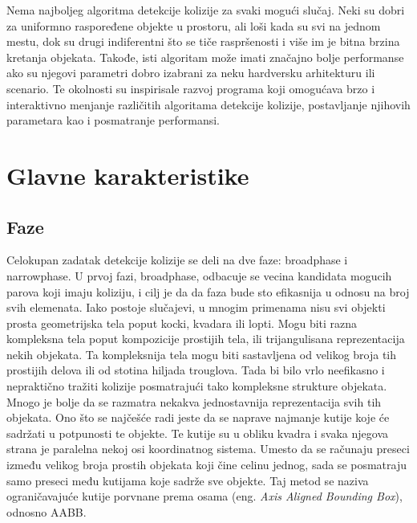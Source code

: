 \documentclass[12pt,oneside]{memoir}
\begin{document}
Nema najboljeg algoritma detekcije kolizije za svaki mogući slučaj. 
Neki su dobri za uniformno raspoređene objekte u prostoru, ali loši kada su svi na jednom mestu, 
dok su drugi indiferentni što se tiče raspršenosti i više im je bitna brzina kretanja objekata.
Takođe, isti algoritam može imati značajno bolje performanse ako su njegovi parametri dobro 
izabrani za neku hardversku arhitekturu ili scenario. 
Te okolnosti su inspirisale razvoj programa koji omogućava brzo i interaktivno menjanje različitih
algoritama detekcije kolizije, postavljanje njihovih parametara kao i posmatranje performansi.

\chapter{Glavne karakteristike}
\label{sec:karakteristike}

\section{Faze}

Celokupan zadatak detekcije kolizije se deli na dve faze: broadphase i narrowphase. 
U prvoj fazi, broadphase, odbacuje se vecina kandidata mogucih parova koji imaju koliziju, i cilj je da 
da faza bude sto efikasnija u odnosu na broj svih elemenata.
Iako postoje slučajevi, u mnogim primenama nisu svi objekti prosta geometrijska tela poput kocki, kvadara ili lopti.
Mogu biti razna kompleksna tela poput kompozicije prostijih tela, ili trijangulisana reprezentacija 
nekih objekata. Ta kompleksnija tela mogu biti sastavljena od velikog broja tih prostijih delova ili
od stotina hiljada trouglova. Tada bi bilo vrlo neefikasno i nepraktično tražiti kolizije posmatrajući
tako kompleksne strukture objekata. Mnogo je bolje da se razmatra nekakva jednostavnija reprezentacija svih 
tih objekata. Ono što se najčešće radi jeste da se naprave najmanje kutije koje će sadržati u potpunosti te objekte.
Te kutije su u obliku kvadra i svaka njegova strana je paralelna nekoj osi koordinatnog sistema. 
Umesto da se računaju preseci između velikog broja prostih objekata koji čine celinu jednog, sada se posmatraju 
samo preseci među kutijama koje sadrže sve objekte. Taj metod se naziva ograničavajuće kutije
porvnane prema osama (eng. {\em Axis Aligned Bounding Box}), odnosno AABB.
\end{document}
